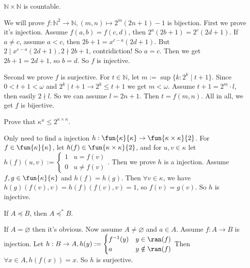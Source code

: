\documentclass{ctexart}
\begin{document}
\begin{problem}
 $\mathbb{N} \times \mathbb{N}$ is countable.
\end{problem}

\begin{solution}
 We will prove $f:\mathbb{N}^2\to \mathbb{N},(m,n)\mapsto 2^m(2n+1)-1$ is bijection. First we prove it's injection. Assume $f(a,b)=f(c,d)$, then $2^a(2b+1)=2^c(2d+1)$. If $a\neq c$, assume $a<c$, then $2b+1=x^{c-a}(2d+1)$. But $2\mid x^{c-a}(2d+1),2\nmid 2b+1$, contridiction! So $a=c$. Then we get $2b+1=2d+1$, so $b=d$. So $f$ is injective. 

 Second we prove $f$ is surjective. For $t\in \mathbb{N}$, let $m:=\sup\{k:2^k\mid t+1\}$. Since $0<t+1<\omega$ and $2^k\mid t+1\to 2^k\leq t+1$ we get $m<\omega$. Assume $t+1=2^m\cdot l$, then easily $2\nmid l$. So we can assume $l=2n+1$. Then $t=f(m,n)$. 
 All in all, we get $f$ is bijective.
\end{solution}

\begin{problem}
 Prove that $\kappa^\kappa \leq 2^{\kappa \times \kappa}$.
\end{problem}

\begin{solution}
 Only need to find a injection $h:\fun{\kappa}{\kappa}\to \fun{\kappa\times \kappa}{2}$. For $f\in \fun{\kappa}{\kappa}$, let $h(f)\in \fun{\kappa\times \kappa}{2}$, and for $u,v\in \kappa$ let $h(f)(u,v):=\begin{cases}
  1 & u= f(v)\\
  0 & u\neq f(v)
 \end{cases}$. Then we prove $h$ is a injection. Assume $f,g\in \fun{\kappa}{\kappa}$ and $h(f)=h(g)$. Then $\forall v\in \kappa$, we have $h(g)(f(v),v)=h(f)(f(v),v)=1$, so $f(v)=g(v)$. So $h$ is injective. 
\end{solution}

\begin{problem}
 If $A \preccurlyeq B$, then $A \preccurlyeq^* B$.
\end{problem}

\begin{solution}
 If $A=\varnothing$ then it's obvious. Now assume $A\neq \varnothing$ and $a\in A$. Assume $f:A\to B$ is injection. Let $h:B\to A,h(y):=\begin{cases}
  f^{-1}(y) & y\in \ran(f)\\
  a & y\notin \ran(f)
 \end{cases}$
 Then $\forall x\in A,h(f(x))=x$. So $h$ is surjective. 
\end{solution}
\end{document}
